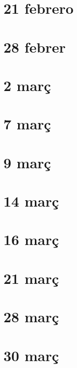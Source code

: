 \documentclass[../main.tex]{subfiles}
\begin{document}
\section{21 febrero}


\section{28 febrer}


\section{2 març}


\section{7 març}




\section{9 març}






\section{14 març}




\section{16 març} 







\section{21 març}



\section{28 març}



\section{30 març}
\end{document}
